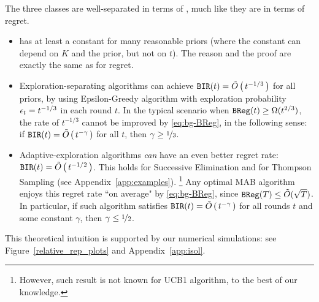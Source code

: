 The three classes are well-separated in terms of \BIR, much like they are in terms of regret.
\begin{itemize}
\item \DynGreedy has at least a constant \BIR for many reasonable priors (where the constant can depend on $K$ and the prior, but not on $t$). The reason and the proof are exactly the same as for regret.

\item Exploration-separating algorithms can achieve
    $\mathtt{BIR}(t) = \tilde{O}\left(\,t^{-1/3}\,\right)$
for all priors, \eg by using Epsilon-Greedy algorithm with exploration probability $\epsilon_t = t^{-1/3}$ in each round $t$.
In the typical scenario when
 $\mathtt{BReg}(t)\geq \Omega(t^{2/3})$,
the \BIR rate of $t^{-1/3}$  cannot be improved by \eqref{eq:bg-BReg}, in the following sense:
if
    $\mathtt{BIR}(t) = \tilde{O}\left(\,t^{-\gamma}\,\right)$
for all $t$, then $\gamma\geq \nicefrac{1}{3}$.

\item Adaptive-exploration algorithms \emph{can} have an even better regret rate: $\mathtt{BIR}(t) = \tilde{O}\left(\, t^{-1/2} \,\right) $. This holds for Successive Elimination \citep{EvenDar-icml06} and for Thompson Sampling (see Appendix~\ref{app:examples}).%
    \footnote{However, such result is not known for UCB1 algorithm, to the best of our knowledge.}
    Any optimal MAB algorithm enjoys this regret rate ``on average" by \eqref{eq:bg-BReg}, since
        $\mathtt{BReg}(T)\leq \tilde{O}(\sqrt{T})$.
    In particular, if such algorithm satisfies
        $\mathtt{BIR}(t) = \tilde{O}\left(\,t^{-\gamma}\,\right)$
    for all rounds $t$ and some constant $\gamma$, then $\gamma \leq \nicefrac{1}{2}$.

\end{itemize}

\noindent This theoretical intuition is supported by our numerical simulations: see
Figure~\ref{relative_rep_plots} and Appendix~\ref{app:isol}.



